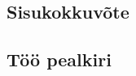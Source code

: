 \begin{otherlanguage}{estonian}
\chapter*{Sisukokkuv\~ote}

\section*{T\"o\"o pealkiri} %

\end{otherlanguage}